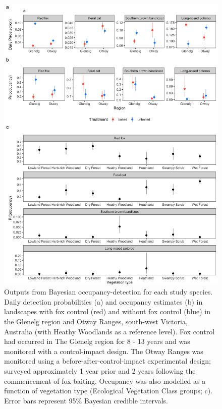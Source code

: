 \documentclass[]{elsarticle} %
\begin{document}
\begin{figure}

{\centering \includegraphics[width=0.8\linewidth]{../figs/occ_det_fox_control} 

}

\caption{Outputs from Bayesian occupancy-detection for each study species. Daily detection probabilities (a) and occupancy estimates (b) in landscapes with fox control (red) and without fox control (blue) in the Glenelg region and Otway Ranges, south-west Victoria, Australia (with Heathy Woodlands as a reference level). Fox control had occurred in The Glenelg region for 8 - 13 years and was monitored with a control-impact design. The Otway Ranges was monitored using a before-after-control-impact experimental design; surveyed approximately 1 year prior and 2 years following the commencement of fox-baiting. Occupancy was also modelled as a function of vegetation type (Ecological Vegetation Class groups; c). Error bars represent 95\% Bayesian credible intervals.}\label{fig:occ-det}
\end{figure}

\newpage
\end{document}
